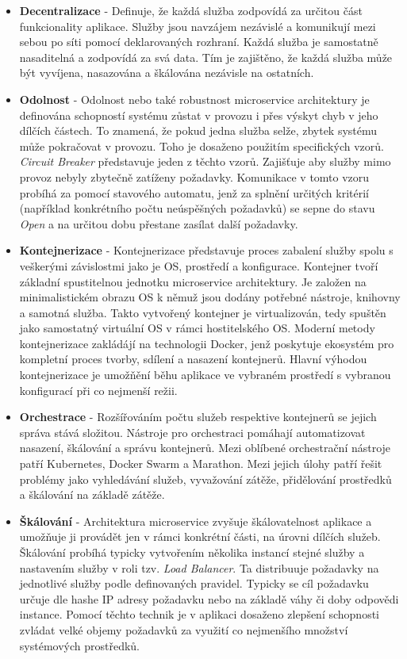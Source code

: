 \begin{itemize}
    \item \textbf{Decentralizace} - Definuje, že každá služba zodpovídá za určitou část funkcionality aplikace. Služby jsou navzájem nezávislé a komunikují mezi sebou po síti pomocí deklarovaných rozhraní. Každá služba je samostatně nasaditelná a zodpovídá za svá data. \cite{Gammelgaard2021} Tím je zajištěno, že každá služba může být vyvíjena, nasazována a škálována nezávisle na ostatních.
    \item \textbf{Odolnost} - Odolnost nebo také robustnost microservice architektury je definována schopností systému zůstat v provozu i přes výskyt chyb v jeho dílčích částech. To znamená, že pokud jedna služba selže, zbytek systému může pokračovat v provozu. Toho je dosaženo použitím specifických vzorů. \emph{Circuit Breaker} představuje jeden z těchto vzorů. Zajišťuje aby služby mimo provoz nebyly zbytečně zatíženy požadavky. Komunikace v tomto vzoru probíhá za pomocí stavového automatu, jenž za splnění určitých kritérií (například konkrétního počtu neúspěšných požadavků) se sepne do stavu \emph{Open} a na určitou dobu přestane zasílat další požadavky. \cite{Gammelgaard2021}
    \item \textbf{Kontejnerizace} - Kontejnerizace představuje proces zabalení služby spolu s veškerými závislostmi jako je OS, prostředí a konfigurace. Kontejner tvoří základní spustitelnou jednotku microservice architektury. Je založen na minimalistickém obrazu OS k němuž jsou dodány potřebné nástroje, knihovny a samotná služba. Takto vytvořený kontejner je virtualizován, tedy spuštěn jako samostatný virtuální OS v rámci hostitelského OS. \cite{dockerdocs} Moderní metody kontejnerizace zakládájí na technologii Docker, jenž poskytuje ekosystém pro kompletní proces tvorby, sdílení a nasazení kontejnerů. Hlavní výhodou kontejnerizace je umožňění běhu aplikace ve vybraném prostředí s vybranou konfigurací při co nejmenší režii.
    \item \textbf{Orchestrace} - Rozšířováním počtu služeb respektive kontejnerů se jejich správa stává složitou. Nástroje pro orchestraci pomáhají automatizovat nasazení, škálování a správu kontejnerů. Mezi oblíbené orchestrační nástroje patří Kubernetes, Docker Swarm a Marathon. \cite{Williams2023} Mezi jejich úlohy patří řešit problémy jako vyhledávání služeb, vyvažování zátěže, přidělování prostředků a škálování na základě zátěže.
    \item \textbf{Škálování} - Architektura microservice zvyšuje škálovatelnost aplikace a umožňuje ji provádět jen v rámci konkrétní části, na úrovni dílčích služeb. Škálování probíhá typicky vytvořením několika instancí stejné služby a nastavením služby v roli tzv. \emph{Load Balancer}. Ta distribuuje požadavky na jednotlivé služby podle definovaných pravidel. Typicky se cíl požadavku určuje dle hashe IP adresy požadavku nebo na základě váhy či doby odpovědi instance. Pomocí těchto technik je v aplikaci dosaženo zlepšení schopnosti zvládat velké objemy požadavků za využití co nejmenšího množství systémových prostředků. \cite{Gammelgaard2021}
\end{itemize}

